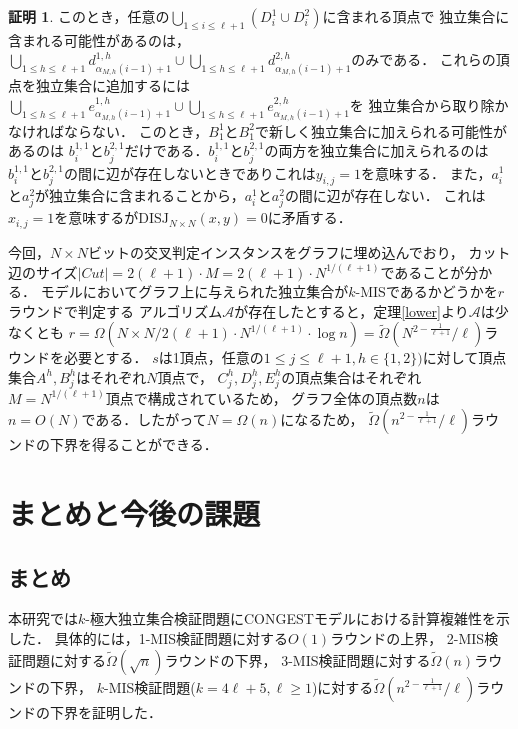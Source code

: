 \documentclass[11pt,a4paper]{jarticle}
\newcommand{\CONGEST}{\textsf{CONGEST}}
\theoremstyle{definition}
\newtheorem*{prf*}{証明}
\begin{document}
\begin{prf*}
このとき，任意の$\bigcup_{1 \leq i \leq \ell+1}(D^{1}_{i}\cup D^{2}_{i})$に含まれる頂点で
独立集合に含まれる可能性があるのは，
$\bigcup_{1\leq h \leq \ell+1} d^{1,h}_{\alpha_{M,h}(i-1)+1}\cup 
\bigcup_{1\leq h \leq \ell+1} d^{2,h}_{\alpha_{M,h}(i-1)+1}$のみである．
これらの頂点を独立集合に追加するには
$\bigcup_{1\leq h \leq \ell+1} e^{1,h}_{\alpha_{M,h}(i-1)+1}\cup 
\bigcup_{1\leq h \leq \ell+1} e^{2,h}_{\alpha_{M,h}(i-1)+1}$を
独立集合から取り除かなければならない．
このとき，$B^{1}_{1}$と$B^{2}_{1}$で新しく独立集合に加えられる可能性があるのは
$b^{1,1}_{i}$と$b^{2,1}_{j}$だけである．$b^{1,1}_{i}$と$b^{2,1}_{j}$の両方を独立集合に加えられるのは
$b^{1,1}_{i}$と$b^{2,1}_{j}$の間に辺が存在しないときでありこれは$y_{i,j}=1$を意味する．
また，$a^{1}_{i}$と$a^{2}_{j}$が独立集合に含まれることから，$a^{1}_{i}$と$a^{2}_{j}$の間に辺が存在しない．
これは$x_{i,j}=1$を意味するが$\mathrm{DISJ}_{N\times N}(x,y)=0$に矛盾する．

今回，$N \times N$ビットの交叉判定インスタンスをグラフに埋め込んでおり，
カット辺のサイズ$|\mathit{Cut}| = 2(\ell + 1) \cdot M = 2(\ell + 1) \cdot N^{1/(\ell + 1)}$であることが分かる．
\sloppy{\CONGEST}モデルにおいてグラフ上に与えられた独立集合が$k$-MISであるかどうかを$r$ラウンドで判定する
アルゴリズム$\mathcal{A}$が存在したとすると，定理\ref{lower}より$\mathcal{A}$は少なくとも
$r = \Omega \left(N \times N/2(\ell + 1) \cdot N^{1/(\ell + 1)} \cdot \log n\right)=\tilde{\Omega}\left(N^{2 - \frac{1}{\ell + 1}}/\ell \right)$ラウンドを必要とする．
$s$は1頂点，任意の$1\leq j \leq \ell+1, h \in \{1, 2\})$に対して頂点集合$A^{h}, B^{h}_{j}$はそれぞれ$N$頂点で，
$C^{h}_{j},D^{h}_{j},E^{h}_{j}$の頂点集合はそれぞれ$M=N^{1/(\ell + 1)}$頂点で構成されているため，
グラフ全体の頂点数$n$は$n = O(N)$である．したがって$N = \Omega(n)$になるため，
$\tilde{\Omega}\left(n^{2 - \frac{1}{\ell + 1}}/\ell \right)$ラウンドの下界を得ることができる．
\end{prf*}
\newpage

\section{まとめと今後の課題}
\subsection{まとめ}
本研究では$k$-極大独立集合検証問題に{\CONGEST}モデルにおける計算複雑性を示した．
具体的には，1-MIS検証問題に対する$O(1)$ラウンドの上界，
2-MIS検証問題に対する$\tilde{\Omega} (\sqrt{n})$ラウンドの下界，
3-MIS検証問題に対する$\tilde{\Omega} (n)$ラウンドの下界，
$k$-MIS検証問題($k = 4\ell + 5, \ell \geq 1$)に対する$\tilde{\Omega}\left(n^{2 - \frac{1}{\ell + 1}}/\ell \right)$ラウンドの下界を証明した．
\end{document}
